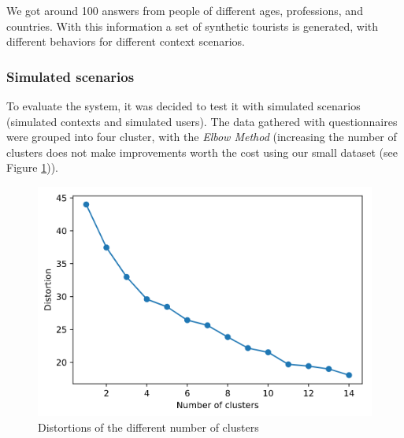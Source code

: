     We got around 100 answers from people of different ages, professions, and countries.  With this information a set of synthetic tourists is generated, with different behaviors for different context scenarios.
    


\subsubsection{Simulated scenarios}
To evaluate the system, it was decided to test it with simulated scenarios (simulated contexts and simulated users).  
The data gathered with questionnaires were grouped into four cluster, with the \textit{Elbow Method} (increasing the number of clusters  does not make improvements worth the cost using our small dataset (see Figure \ref{fig:elbow})).



\begin{figure}[h]
    \centering
    \includegraphics[scale=0.45]{elbow.png}
    \caption{Distortions of the different number of clusters}
    \label{fig:elbow}
\end{figure}

